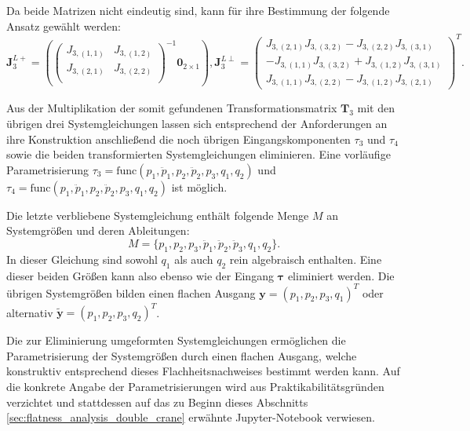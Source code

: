Da beide Matrizen nicht eindeutig sind, kann für ihre Bestimmung der folgende Ansatz gewählt werden: 
\begin{equation}
	\mathbf{J}_3^{L+} =
	\left(
	\left(\begin{matrix}
		J_{3, (1,1)} & J_{3, (1,2)}\\
		J_{3, (2,1)} & J_{3, (2,2)}\\
	\end{matrix}\right)^{-1}	
	\mathbf{0}_{2 \times 1}
	\right), 		
	\mathbf{J}_3^{L\perp} =
	\left(\begin{matrix}
		J_{3, (2,1)} J_{3, (3,2)} - J_{3, (2,2)} J_{3, (3,1)} \\
		-J_{3, (1,1)} J_{3, (3,2)} + J_{3, (1,2)} J_{3, (3,1)} \\
		J_{3, (1,1)} J_{3, (2,2)} - J_{3, (1,2)} J_{3, (2,1)}
	\end{matrix}\right)^T.
\end{equation}

Aus der Multiplikation der somit gefundenen Transformationsmatrix $\mathbf{T}_3$ mit den übrigen drei Systemgleichungen lassen sich entsprechend der Anforderungen an ihre Konstruktion anschließend die noch übrigen Eingangskomponenten $\tau_{3}$ und $\tau_{4}$ sowie die beiden transformierten Systemgleichungen eliminieren. Eine vorläufige Parametrisierung ${\tau_3 = \mathrm{func}(p_1, \ddot{p}_1, p_2, \ddot{p}_2, p_3, q_1, q_2)}$ und ${\tau_4 = \mathrm{func}(p_1, \ddot{p}_1, p_2, \ddot{p}_2, p_3, q_1, q_2)}$ ist möglich.

Die letzte verbliebene Systemgleichung enthält folgende Menge $M$ an Systemgrößen und deren Ableitungen:
\begin{equation}
	M = \{p_1, p_2, p_3, \ddot{p}_1, \ddot{p}_2, \ddot{p}_3, q_1, q_2 \}.
\end{equation}
In dieser Gleichung sind sowohl $q_1$ als auch $q_2$ rein algebraisch enthalten. Eine dieser beiden Größen kann also ebenso wie der Eingang $\boldsymbol{\tau}$ eliminiert werden. Die übrigen Systemgrößen bilden einen flachen Ausgang $\mathbf{y} = (p_1, p_2, p_3, q_1)^T$ oder alternativ ${\tilde{\mathbf{y}} = (p_1, p_2, p_3, q_2)^T}$.

Die zur Eliminierung umgeformten Systemgleichungen ermöglichen die Parametrisierung der Systemgrößen durch einen flachen Ausgang, welche konstruktiv entsprechend dieses Flachheitsnachweises bestimmt werden kann. Auf die konkrete Angabe der Parametrisierungen wird aus Praktikabilitätsgründen verzichtet und stattdessen auf das zu Beginn dieses Abschnitts \ref{sec:flatness_analysis_double_crane} erwähnte Jupyter-Notebook verwiesen.

